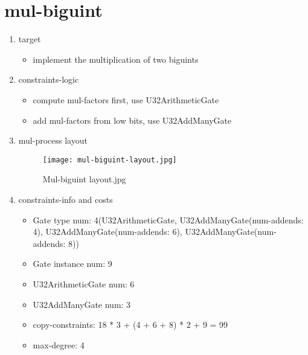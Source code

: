 \section{mul-biguint}
\label{mul-biguint}

\begin{enumerate}
    \item target
        \begin{itemize}
            \item implement the multiplication of two biguints
        \end{itemize}
    \item constraints-logic
        \begin{itemize}
            \item compute mul-factors first, use U32ArithmeticGate
            \item add mul-factors from low bits, use U32AddManyGate
        \end{itemize}
    \item mul-process layout
        \begin{figure}[!ht]
            \centering
            \texttt{[image: mul-biguint-layout.jpg]}
            \caption{Mul-biguint layout.jpg}
            \label{fig:mul-biguint-layout.jpg}
        \end{figure}
    
    \item constraints-info and costs
        \begin{itemize}
            \item Gate type num: 4(U32ArithmeticGate, U32AddManyGate(num-addends: 4), U32AddManyGate(num-addends: 6), U32AddManyGate(num-addends: 8))
            \item Gate instance num: 9
            \item U32ArithmeticGate num: 6
            \item U32AddManyGate num: 3
            \item copy-constraints: 18 * 3 + (4 + 6 + 8) * 2 + 9 = 99
            \item max-degree: 4
        \end{itemize}

\end{enumerate}